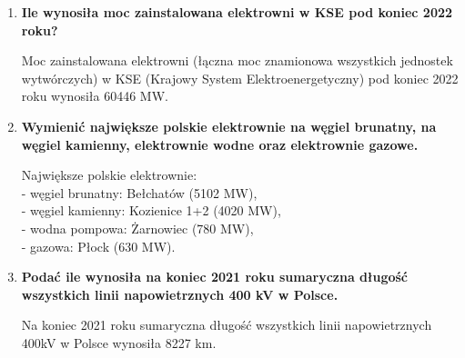 \documentclass[12pt]{article}
\begin{document}
\begin{enumerate}
    \item \textbf{Ile wynosiła moc zainstalowana elektrowni w KSE pod koniec 2022 roku?}
    
        Moc zainstalowana elektrowni (łączna moc znamionowa wszystkich jednostek wytwórczych) 
        w KSE (Krajowy System Elektroenergetyczny) pod koniec 2022 roku wynosiła 60446 MW.

    \item \textbf{Wymienić największe polskie elektrownie na węgiel brunatny, na węgiel kamienny, elektrownie wodne oraz elektrownie gazowe.}
    
        Największe polskie elektrownie:\\
        - węgiel brunatny: Bełchatów (5102 MW),\\
        - węgiel kamienny: Kozienice 1+2 (4020 MW),\\
        - wodna pompowa: Żarnowiec (780 MW),\\
        - gazowa: Płock (630 MW).

    \item \textbf{Podać ile wynosiła na koniec 2021 roku sumaryczna długość wszystkich linii napowietrznych 400 kV w Polsce.}
    
        Na koniec 2021 roku sumaryczna długość wszystkich linii napowietrznych 400kV w Polsce wynosiła 8227 km.

\end{enumerate}

\newpage
\end{document}
